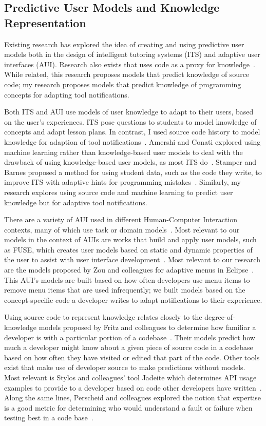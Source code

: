 \documentclass{llncs}
\begin{document}
\subsection{Predictive User Models and Knowledge Representation}
Existing research has explored the idea of creating and using predictive user models both in the design of intelligent tutoring systems (ITS) and adaptive user interfaces (AUI). Research also exists that uses code as a proxy for knowledge~\cite{fritz2010degree}. While related, this research proposes models that predict knowledge of source code; my research proposes models that predict knowledge of programming concepts for adapting tool notifications.

Both ITS and AUI use models of user knowledge to adapt to their users, based on the user's experiences.
ITS pose questions to students to model knowledge of concepts and adapt lesson plans. In contrast, I used source code history to model knowledge for adaption of tool notifications~\cite{murray1999authoring}.
Amershi and Conati explored using machine learning rather than knowledge-based user models to deal with the drawback of using knowledge-based user models, as most ITS do~\cite{amershi2007unsupervised}. 
Stamper and Barnes proposed a method for using student data, such as the code they write, to improve ITS with adaptive hints for programming mistakes~\cite{stamper2009unsupervised}.
Similarly, my research explores using source code and machine learning to predict user knowledge but for adaptive tool notifications.

There are a variety of AUI used in different Human-Computer Interaction contexts, many of which use task or domain models~\cite{schlungbaum1996model}. Most relevant to our models in the context of AUIs are works that build and apply user models, such as FUSE, which creates user models based on static and dynamic properties of the user to assist with user interface development~\cite{lonczewski1996fuse}. Most relevant to our research are the models proposed by Zou and colleagues for adaptive menus in Eclipse~\cite{zou2008adapting}.
This AUI's models are built based on how often developers use menu items to remove menu items that are used infrequently; we built models based on the concept-specific code a developer writes to adapt notifications to their experience.


Using source code to represent knowledge relates closely to the degree-of-knowledge models proposed by Fritz and colleagues to determine how familiar a developer is with a particular portion of a codebase~\cite{fritz2010degree}. Their models predict how much a developer might know about a given piece of source code in a codebase based on how often they have visited or edited that part of the code.
Other tools exist that make use of developer source to make predictions without models. Most relevant is Stylos and colleagues' tool Jadeite which determines API usage examples to provide to a developer based on code other developers have written~\cite{stylos2009improving}.
Along the same lines, Perscheid and colleagues explored the notion that expertise is a good metric for determining who would understand a fault or failure when testing best in a code base~\cite{perscheid2012test}.
\end{document}
